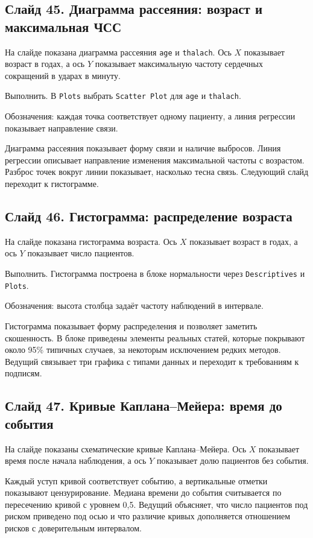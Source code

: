 \documentclass[11pt,a4paper]{article}
\begin{document}
\subsection*{Слайд 45. Диаграмма рассеяния: возраст и максимальная ЧСС}
\begin{onslide}
На слайде показана диаграмма рассеяния \texttt{age} и \texttt{thalach}. Ось $X$ показывает возраст в годах, а ось $Y$ показывает максимальную частоту сердечных сокращений в ударах в минуту.
\end{onslide}
\begin{jamovi}
Выполнить. В \texttt{Plots} выбрать \texttt{Scatter Plot} для \texttt{age} и \texttt{thalach}.\par Обозначения: каждая точка соответствует одному пациенту, а линия регрессии показывает направление связи.
\end{jamovi}
Диаграмма рассеяния показывает форму связи и наличие выбросов. Линия регрессии описывает направление изменения максимальной частоты с возрастом. Разброс точек вокруг линии показывает, насколько тесна связь. Следующий слайд переходит к гистограмме.

\subsection*{Слайд 46. Гистограмма: распределение возраста}
\begin{onslide}
На слайде показана гистограмма возраста. Ось $X$ показывает возраст в годах, а ось $Y$ показывает число пациентов.
\end{onslide}
\begin{jamovi}
Выполнить. Гистограмма построена в блоке нормальности через \texttt{Descriptives} и \texttt{Plots}.\par Обозначения: высота столбца задаёт частоту наблюдений в интервале.
\end{jamovi}
Гистограмма показывает форму распределения и позволяет заметить скошенность. В блоке приведены элементы реальных статей, которые покрывают около 95\% типичных случаев, за некоторым исключением редких методов. Ведущий связывает три графика с типами данных и переходит к требованиям к подписям.

\subsection*{Слайд 47. Кривые Каплана–Мейера: время до события}
\begin{onslide}
На слайде показаны схематические кривые Каплана--Мейера. Ось $X$ показывает время после начала наблюдения, а ось $Y$ показывает долю пациентов без события.
\end{onslide}
Каждый уступ кривой соответствует событию, а вертикальные отметки показывают цензурирование. Медиана времени до события считывается по пересечению кривой с уровнем 0,5. Ведущий объясняет, что число пациентов под риском приведено под осью и что различие кривых дополняется отношением рисков с доверительным интервалом.
\end{document}
